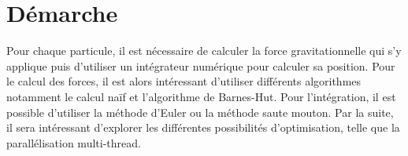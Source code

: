 \section{Démarche}

Pour chaque particule, il est nécessaire de calculer la force gravitationnelle qui s'y applique puis d'utiliser un intégrateur numérique pour calculer sa position. Pour le calcul des forces, il est alors intéressant d'utiliser différents algorithmes notamment le calcul naïf et l'algorithme de Barnes-Hut. Pour l'intégration, il est possible d'utiliser la méthode d'Euler ou la méthode saute mouton.
Par la suite, il sera intéressant d'explorer les différentes possibilités d'optimisation, telle que la parallélisation multi-thread. 